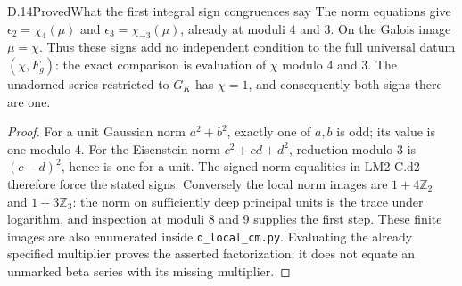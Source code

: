 \begin{statement}{D.14}{Proved}{What the first integral sign congruences say}
The norm equations give $\epsilon_2=\chi_4(\mu)$ and $\epsilon_3=\chi_{-3}(\mu)$, already at moduli 4 and 3. On the Galois image $\mu=\chi$. Thus these signs add no independent condition to the full universal datum $(\chi,F_g)$: the exact comparison is evaluation of $\chi$ modulo 4 and 3. The unadorned series restricted to $G_K$ has $\chi=1$, and consequently both signs there are one.
\end{statement}
\begin{proof}
For a unit Gaussian norm $a^2+b^2$, exactly one of $a,b$ is odd; its value is one modulo 4. For the Eisenstein norm $c^2+cd+d^2$, reduction modulo 3 is $(c-d)^2$, hence is one for a unit. The signed norm equalities in LM2 C.d2 therefore force the stated signs. Conversely the local norm images are $1+4\mathbb Z_2$ and $1+3\mathbb Z_3$: the norm on sufficiently deep principal units is the trace under logarithm, and inspection at moduli 8 and 9 supplies the first step. These finite images are also enumerated inside \texttt{d\_local\_cm.py}. Evaluating the already specified multiplier proves the asserted factorization; it does not equate an unmarked beta series with its missing multiplier.
\end{proof}

